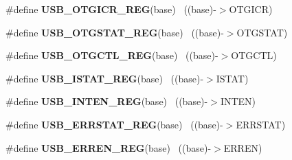 \begin{DoxyCompactItemize}
\item 
\hypertarget{group___u_s_b___register___accessor___macros_gabb95027a64757ad6dd1ede1d71e5189e}{}\#define {\bfseries U\+S\+B\+\_\+\+O\+T\+G\+I\+C\+R\+\_\+\+R\+E\+G}(base)                                      ~((base)-\/$>$O\+T\+G\+I\+C\+R)\label{group___u_s_b___register___accessor___macros_gabb95027a64757ad6dd1ede1d71e5189e}

\item 
\hypertarget{group___u_s_b___register___accessor___macros_ga32e34f54ace5fad23a69c81cab333ca1}{}\#define {\bfseries U\+S\+B\+\_\+\+O\+T\+G\+S\+T\+A\+T\+\_\+\+R\+E\+G}(base)                                    ~((base)-\/$>$O\+T\+G\+S\+T\+A\+T)\label{group___u_s_b___register___accessor___macros_ga32e34f54ace5fad23a69c81cab333ca1}

\item 
\hypertarget{group___u_s_b___register___accessor___macros_ga06fe688c6865edd89882b91cc194330d}{}\#define {\bfseries U\+S\+B\+\_\+\+O\+T\+G\+C\+T\+L\+\_\+\+R\+E\+G}(base)                                      ~((base)-\/$>$O\+T\+G\+C\+T\+L)\label{group___u_s_b___register___accessor___macros_ga06fe688c6865edd89882b91cc194330d}

\item 
\hypertarget{group___u_s_b___register___accessor___macros_gab6ac8d1d423f3e1a470be14236d70a4e}{}\#define {\bfseries U\+S\+B\+\_\+\+I\+S\+T\+A\+T\+\_\+\+R\+E\+G}(base)                                        ~((base)-\/$>$I\+S\+T\+A\+T)\label{group___u_s_b___register___accessor___macros_gab6ac8d1d423f3e1a470be14236d70a4e}

\item 
\hypertarget{group___u_s_b___register___accessor___macros_ga449f9c03283cd7a1b78126211670fcf8}{}\#define {\bfseries U\+S\+B\+\_\+\+I\+N\+T\+E\+N\+\_\+\+R\+E\+G}(base)                                        ~((base)-\/$>$I\+N\+T\+E\+N)\label{group___u_s_b___register___accessor___macros_ga449f9c03283cd7a1b78126211670fcf8}

\item 
\hypertarget{group___u_s_b___register___accessor___macros_ga7b4d3f12786ff16600f22ef96106cb78}{}\#define {\bfseries U\+S\+B\+\_\+\+E\+R\+R\+S\+T\+A\+T\+\_\+\+R\+E\+G}(base)                                    ~((base)-\/$>$E\+R\+R\+S\+T\+A\+T)\label{group___u_s_b___register___accessor___macros_ga7b4d3f12786ff16600f22ef96106cb78}

\item 
\hypertarget{group___u_s_b___register___accessor___macros_ga5bcc0b18083d1e8ca3df5215acd96ffd}{}\#define {\bfseries U\+S\+B\+\_\+\+E\+R\+R\+E\+N\+\_\+\+R\+E\+G}(base)                                        ~((base)-\/$>$E\+R\+R\+E\+N)\label{group___u_s_b___register___accessor___macros_ga5bcc0b18083d1e8ca3df5215acd96ffd}


\end{DoxyCompactItemize}
